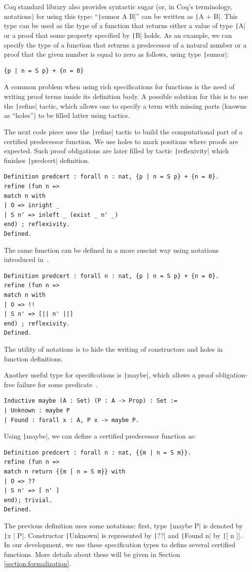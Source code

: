 \documentclass[oneside,12pt]{scrbook}
\theoremstyle{definition}
\newcommand{\coq}[1]{\texttt|#1|}
\theoremstyle{plain}
\theoremstyle{definition}
\begin{document}
Coq standard library also provides syntactic sugar (or, in Coq's
terminology, notations) for using this type: ``\coq{sumor A B}'' can
be written as \coq{A + {B}}.
This type can be used as the type of a function that returns either a
value of type \coq{A} or a proof that some property specified by
\coq{B} holds.
As an example, we can specify the type of a function that returns a
predecessor of a natural number or a proof that the given number is
equal to zero as follows, using type \coq{sumor}:
\begin{verbatim}
{p | n = S p} + {n = 0}
\end{verbatim}  
A common problem when using rich specifications for functions is the need
of writing proof terms inside its definition body. A possible solution for
this is to use the \coq{refine} tactic, which allows one to specify a term with
missing parts (knowns as ``holes'') to be filled latter using tactics.

The next code piece uses the \coq{refine} tactic to build the computational part
of a certified predecessor function. We use holes to mark positions where proofs are
expected. Such proof obligations are later filled by tactic \coq{reflexivity} which finishes
\coq{predcert} definition.

\begin{verbatim}
Definition predcert : forall n : nat, {p | n = S p} + {n = 0}.
refine (fun n =>
match n with
| O => inright _
| S n' => inleft _ (exist _ n' _)
end) ; reflexivity.
Defined.
\end{verbatim}

The same function can be defined in a more suscint way using notations introduced
in~\cite{Chlipala13}.

\begin{verbatim}
Definition predcert : forall n : nat, {p | n = S p} + {n = 0}.
refine (fun n =>
match n with
| O => !!
| S n' => [|| n' ||]
end) ; reflexivity.
Defined.
\end{verbatim}
The utility of notations is to hide the writing of constructors and holes in
function definitions.

Another useful type for specifications is \coq{maybe}, which allows a proof
obligation-free failure for some predicate~\cite{Chlipala13}.
\begin{verbatim}
Inductive maybe (A : Set) (P : A -> Prop) : Set :=
| Unknown : maybe P
| Found : forall x : A, P x -> maybe P.
\end{verbatim}
Using \coq{maybe}, we can define a certified predecessor function as:
\begin{verbatim}
Definition predcert : forall n : nat, {{m | n = S m}}.
refine (fun n =>
match n return {{m | n = S m}} with
| O => ??
| S n' => [ n' ]
end); trivial.
Defined.
\end{verbatim}
The previous definition uses some notations: first, type \coq{maybe P} is
denoted by \coq{{{x | P}}}. Constructor \coq{Unknown} is represented by \coq{??}
and \coq{Found n} by \coq{[ n ]}. In our development, we use these
specification types to define several certified functions. More details about
these will be given in Section \ref{section:formalization}.
\end{document}
